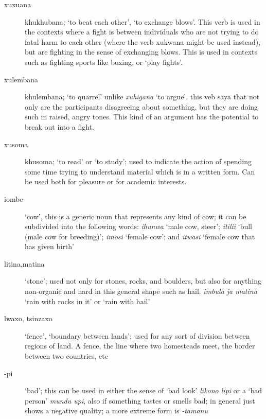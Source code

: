 \begin{description}

\item[xuxu\beta{}ana] khukhubana; `to beat each other', `to exchange blows'.  This verb is used in the contexts where a fight is between individuals who are not trying to do fatal harm to each other (where the verb xukwana might be used instead), but are fighting in the sense of exchanging blows.  This is used in contexts such as fighting sports like boxing, or `play fights'.
\item[xulembana] khulembana; `to quarrel' unlike \emph{xuhi\engma{}gana} `to argue', this veb saya that not only are the participants disagreeing about something, but they are doing such in raised, angry tones.  This kind of an argument has the potential to break out into a fight.
\item[xusoma] khusoma; `to read' or `to study'; used to indicate the action of spending some time trying to understand material which is in a written form.  Can be used both for pleasure or for academic interests.
\item[i\engma{}ombe] `cow', this is a generic noun that represents any kind of cow; it can be subdivided into the following words: \emph{ihunwa} `male cow, steer'; \emph{it\esh{}ili\esh{}i} `bull (male cow for breeding)'; \emph{imosi} `female cow'; and \emph{itwasi} `female cow that has given birth'
\item[lit\esh{}ina,mat\esh{}ina] `stone'; used not only for stones, rocks, and boulders, but also for anything non-organic and hard in this general shape such as hail.  \emph{imbula ja mat\esh{}ina} `rain with rocks in it' or `rain with hail'
\item[lwaxo, tsinzaxo] `fence', `boundary between lands'; used for any sort of division between regions of land.  A fence, the line where two homesteads meet, the border between two countries, etc
\item[-pi] `bad'; this can be used in either the sense of `bad look' \emph{likono lipi} or a `bad person' \emph{mundu upi}, also if something tastes or smells bad; in general just shows a negative quality;  a more extreme form is \emph{-tamanu} 

\end{description}